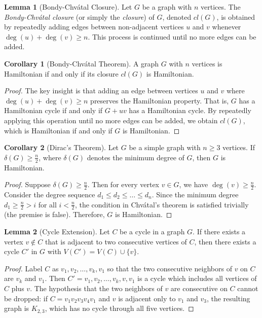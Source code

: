 \documentclass{article}
\theoremstyle{definition}
\newtheorem{lemma}{Lemma}
\newtheorem{corollary}{Corollary}
\begin{document}
\begin{lemma}[Bondy-Chvátal Closure]
Let $G$ be a graph with $n$ vertices. The \emph{Bondy-Chvátal closure} (or simply the \emph{closure}) of $G$, denoted $cl(G)$, is obtained by repeatedly adding edges between non-adjacent vertices $u$ and $v$ whenever $\deg(u) + \deg(v) \geq n$. This process is continued until no more edges can be added.
\end{lemma}

\begin{corollary}[Bondy-Chvátal Theorem]
A graph $G$ with $n$ vertices is Hamiltonian if and only if its closure $cl(G)$ is Hamiltonian.
\end{corollary}

\begin{proof}
The key insight is that adding an edge between vertices $u$ and $v$ where $\deg(u) + \deg(v) \geq n$ preserves the Hamiltonian property. That is, $G$ has a Hamiltonian cycle if and only if $G + uv$ has a Hamiltonian cycle. By repeatedly applying this operation until no more edges can be added, we obtain $cl(G)$, which is Hamiltonian if and only if $G$ is Hamiltonian.
\end{proof}

\begin{corollary}[Dirac's Theorem]
Let $G$ be a simple graph with $n \geq 3$ vertices. If $\delta(G) \geq \frac{n}{2}$, where $\delta(G)$ denotes the minimum degree of $G$, then $G$ is Hamiltonian.
\end{corollary}

\begin{proof}
Suppose $\delta(G) \geq \frac{n}{2}$. Then for every vertex $v \in G$, we have $\deg(v) \geq \frac{n}{2}$. Consider the degree sequence $d_1 \leq d_2 \leq \ldots \leq d_n$. Since the minimum degree $d_1 \geq \frac{n}{2} > i$ for all $i < \frac{n}{2}$, the condition in Chvátal's theorem is satisfied trivially (the premise is false). Therefore, $G$ is Hamiltonian.
\end{proof}

\begin{lemma}[Cycle Extension]
Let $C$ be a cycle in a graph $G$. If there exists a vertex $v \not\in C$ that is adjacent to two consecutive vertices of $C$, then there exists a cycle $C'$ in $G$ with $V(C') = V(C) \cup \{v\}$.
\end{lemma}

\begin{proof}
Label $C$ as $v_1, v_2, \ldots, v_k, v_1$ so that the two consecutive neighbors of $v$ on $C$ are $v_k$ and $v_1$. Then $C' = v_1, v_2, \ldots, v_k, v, v_1$ is a cycle which includes all vertices of $C$ plus $v$. The hypothesis that the two neighbors of $v$ are consecutive on $C$ cannot be dropped: if $C = v_1v_2v_3v_4v_1$ and $v$ is adjacent only to $v_1$ and $v_3$, the resulting graph is $K_{2,3}$, which has no cycle through all five vertices.
\end{proof}
\end{document}

